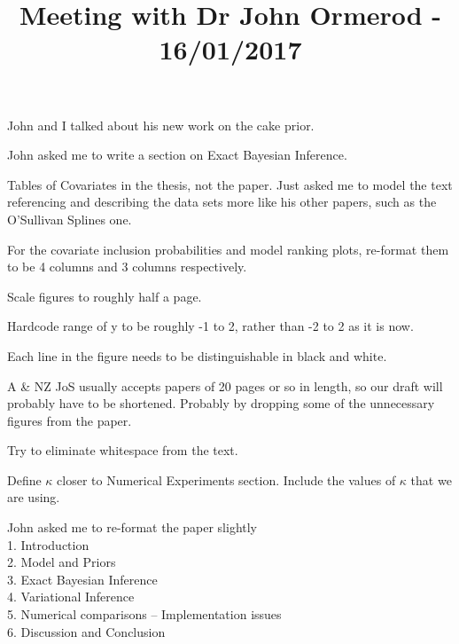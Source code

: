 \documentclass{amsart}
\title{Meeting with Dr John Ormerod - 16/01/2017}
\begin{document}
\maketitle

John and I talked about his new work on the cake prior.

John asked me to write a section on Exact Bayesian Inference.

Tables of Covariates in the thesis, not the paper. Just asked me to model the text referencing and describing
the data sets more like his other papers, such as the O'Sullivan Splines one.

For the covariate inclusion probabilities and model ranking plots, re-format them to be 4 columns and
3 columns respectively.

Scale figures to roughly half a page.

Hardcode range of y to be roughly -1 to 2, rather than -2 to 2 as it is now.

Each line in the figure needs to be distinguishable in black and white.

A \& NZ JoS usually accepts papers of 20 pages or so in length, so our draft will probably have to be 
shortened. Probably by dropping some of the unnecessary figures from the paper.

Try to eliminate whitespace from the text.

Define $\kappa$ closer to Numerical Experiments section. Include the values of $\kappa$ that we are using.

John asked me to re-format the paper slightly \\
1. Introduction \\
2. Model and Priors \\
3. Exact Bayesian Inference \\
4. Variational Inference \\
5. Numerical comparisons -- Implementation issues \\
6. Discussion  and Conclusion
\end{document}
